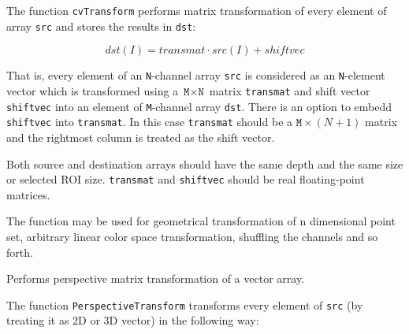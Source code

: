 \begin{description}
\end{description}

The function \texttt{cvTransform} performs matrix transformation of every element of array \texttt{src} and stores the results in \texttt{dst}:

\[
dst(I) = transmat \cdot src(I) + shiftvec %
\]

That is, every element of an \texttt{N}-channel array \texttt{src} is
considered as an \texttt{N}-element vector which is transformed using
a $\texttt{M} \times \texttt{N}$ matrix \texttt{transmat} and shift
vector \texttt{shiftvec} into an element of \texttt{M}-channel array
\texttt{dst}. There is an option to embedd \texttt{shiftvec} into
\texttt{transmat}. In this case \texttt{transmat} should be a $\texttt{M}
\times (N+1)$ matrix and the rightmost column is treated as the shift
vector.

Both source and destination arrays should have the same depth and the
same size or selected ROI size. \texttt{transmat} and \texttt{shiftvec}
should be real floating-point matrices.

The function may be used for geometrical transformation of n dimensional
point set, arbitrary linear color space transformation, shuffling the
channels and so forth.

\label{PerspectiveTransform}

Performs perspective matrix transformation of a vector array.


\begin{description}
\end{description}


The function \texttt{PerspectiveTransform} transforms every element of \texttt{src} (by treating it as 2D or 3D vector) in the following way:

